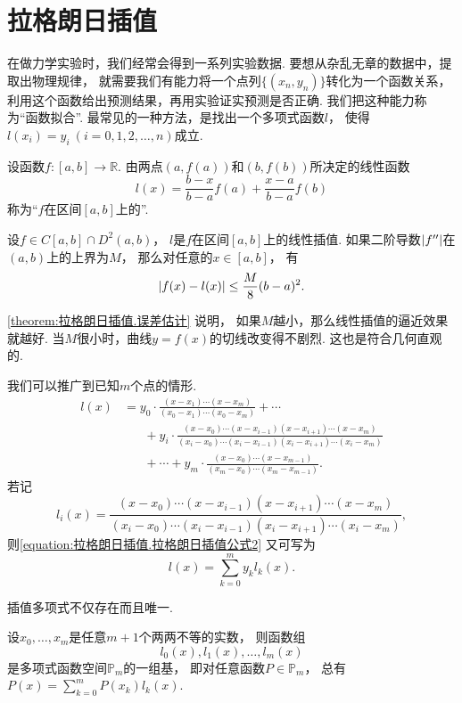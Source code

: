 \section{拉格朗日插值}
在做力学实验时，我们经常会得到一系列实验数据.
要想从杂乱无章的数据中，提取出物理规律，
就需要我们有能力将一个点列\(\{(x_n,y_n)\}\)转化为一个函数关系，
利用这个函数给出预测结果，再用实验证实预测是否正确.
我们把这种能力称为“函数拟合”.
最常见的一种方法，是找出一个多项式函数\(l\)，
使得\(l(x_i) = y_i\ (i=0,1,2,\dotsc,n)\)成立.

\begin{definition}
设函数\(f\colon[a,b]\to\mathbb{R}\).
由两点\((a,f(a))\)和\((b,f(b))\)所决定的线性函数\[
	l(x) = \frac{b-x}{b-a} f(a) + \frac{x-a}{b-a} f(b)
\]称为“\(f\)在区间\([a,b]\)上的”.
\end{definition}

\begin{theorem}\label{theorem:拉格朗日插值.误差估计}
设\(f\in C[a,b]\cap D^2(a,b)\)，
\(l\)是\(f\)在区间\([a,b]\)上的线性插值.
如果二阶导数\(\abs{f''}\)在\((a,b)\)上的上界为\(M\)，
那么对任意的\(x\in[a,b]\)，
有\[
	\abs{f(x)-l(x)}
	\leq \frac{M}8 (b-a)^2.
\]
\end{theorem}
\begin{remark}
\cref{theorem:拉格朗日插值.误差估计} 说明，
如果\(M\)越小，那么线性插值的逼近效果就越好.
当\(M\)很小时，曲线\(y=f(x)\)的切线改变得不剧烈.
这也是符合几何直观的.
\end{remark}

我们可以推广到已知\(m\)个点的情形.
\begin{equation}\label{equation:拉格朗日插值.拉格朗日插值公式2}
	\begin{aligned}
		l(x)
		&= y_0 \cdot \frac{(x-x_1)\dotsm(x-x_m)}{(x_0-x_1)\dotsm(x_0-x_m)}
		+ \dotsb \\
		&\hspace{20pt}
		+ y_i \cdot \frac{(x-x_0)\dotsm(x-x_{i-1})(x-x_{i+1})\dotsm(x-x_m)}
		{(x_i-x_0)\dotsm(x_i-x_{i-1})(x_i-x_{i+1})\dotsm(x_i-x_m)} \\
		&\hspace{20pt}
		+ \dotsb
		+ y_m \cdot \frac{(x-x_0)\dotsm(x-x_{m-1})}{(x_m-x_0)\dotsm(x_m-x_{m-1})}.
	\end{aligned}
\end{equation}
若记\begin{equation}
	l_i(x) = \frac{(x-x_0)\dotsm(x-x_{i-1})(x-x_{i+1})\dotsm(x-x_m)}
	{(x_i-x_0)\dotsm(x_i-x_{i-1})(x_i-x_{i+1})\dotsm(x_i-x_m)},
\end{equation}
则\cref{equation:拉格朗日插值.拉格朗日插值公式2} 又可写为\begin{equation}
	l(x) = \sum_{k=0}^m y_k l_k(x).
\end{equation}

插值多项式不仅存在而且唯一.
\begin{theorem}
设\(x_0,\dotsc,x_m\)是任意\(m+1\)个两两不等的实数，
则函数组\[
	l_0(x), l_1(x), \dotsc, l_m(x)
\]是多项式函数空间\(\mathbb{P}_m\)的一组基，
即对任意函数\(P\in\mathbb{P}_m\)，
总有\(P(x) = \sum_{k=0}^m P(x_k) l_k(x)\).
\end{theorem}
